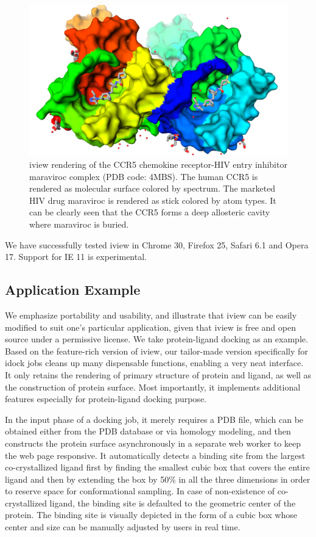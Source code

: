 \documentclass{bioinfo}
\begin{document}
\begin{methods}
\begin{figure}[t]
\centerline{\includegraphics[width=\linewidth]{4MBS.png}}
\caption{iview rendering of the CCR5 chemokine receptor-HIV entry inhibitor maraviroc complex \citep{1348} (PDB code: 4MBS). The human CCR5 is rendered as molecular surface colored by spectrum. The marketed HIV drug maraviroc is rendered as stick colored by atom types. It can be clearly seen that the CCR5 forms a deep allosteric cavity where maraviroc is buried.}\label{fig:4MBS}
\end{figure}

We have successfully tested iview in Chrome 30, Firefox 25, Safari 6.1 and Opera 17. Support for IE 11 is experimental.

\subsection*{Application Example}
We emphasize portability and usability, and illustrate that iview can be easily modified to suit one's particular application, given that iview is free and open source under a permissive license. We take protein-ligand docking as an example. Based on the feature-rich version of iview, our tailor-made version specifically for idock jobs cleans up many dispensable functions, enabling a very neat interface. It only retains the rendering of primary structure of protein and ligand, as well as the construction of protein surface. Most importantly, it implements additional features especially for protein-ligand docking purpose.

In the input phase of a docking job, it merely requires a PDB file, which can be obtained either from the PDB database \citep{539,537} or via homology modeling, and then constructs the protein surface asynchronously in a separate web worker to keep the web page responsive. It automatically detects a binding site from the largest co-crystallized ligand first by finding the smallest cubic box that covers the entire ligand and then by extending the box by 50\% in all the three dimensions in order to reserve space for conformational sampling. In case of non-existence of co-crystallized ligand, the binding site is defaulted to the geometric center of the protein. The binding site is visually depicted in the form of a cubic box whose center and size can be manually adjusted by users in real time.


\end{methods}
\end{document}
